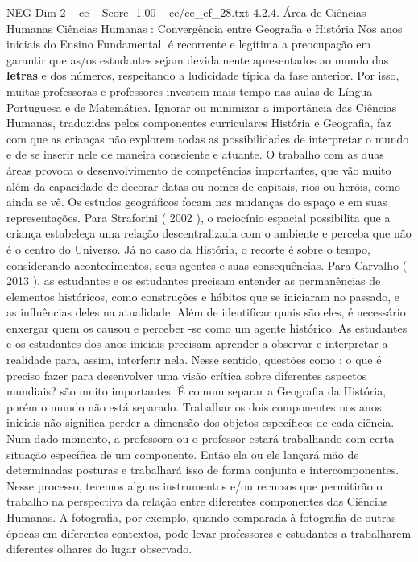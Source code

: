 \begin{textsample}{NEG Dim 2 – ce – Score -1.00 – ce/ce\_ef\_28.txt}  \label{ex:f2_neg_202}
4.2.4.
Área de Ciências Humanas Ciências Humanas : Convergência entre Geografia e História Nos anos iniciais do Ensino Fundamental, é recorrente e legítima a preocupação em garantir que as/os estudantes sejam devidamente apresentados ao mundo das \textbf{letras} e dos números, respeitando a ludicidade típica da fase anterior.
Por isso, muitas professoras e professores investem mais tempo nas aulas de Língua Portuguesa e de Matemática.
Ignorar ou minimizar a importância das Ciências Humanas, traduzidas pelos componentes curriculares História e Geografia, faz com que as crianças não explorem todas as possibilidades de interpretar o mundo e de se inserir nele de maneira consciente e atuante.
O trabalho com as duas áreas provoca o desenvolvimento de competências importantes, que vão muito além da capacidade de decorar datas ou nomes de capitais, rios ou heróis, como ainda se vê.
Os estudos geográficos focam nas mudanças do espaço e em suas representações.
Para Straforini ( 2002 ), o raciocínio espacial possibilita que a criança estabeleça uma relação descentralizada com o ambiente e perceba que não é o centro do Universo.
Já no caso da História, o recorte é sobre o tempo, considerando acontecimentos, seus agentes e suas consequências.
Para Carvalho ( 2013 ), as estudantes e os estudantes precisam entender as permanências de elementos históricos, como construções e hábitos que se iniciaram no passado, e as influências deles na atualidade.
Além de identificar quais são eles, é necessário enxergar quem os causou e perceber -se como um agente histórico.
As estudantes e os estudantes dos anos iniciais precisam aprender a observar e interpretar a realidade para, assim, interferir nela.
Nesse sentido, questões como : o que é preciso fazer para desenvolver uma visão crítica sobre diferentes aspectos mundiais? são muito importantes.
É comum separar a Geografia da História, porém o mundo não está separado.
Trabalhar os dois componentes nos anos iniciais não significa perder a dimensão dos objetos específicos de cada ciência.
Num dado momento, a professora ou o professor estará trabalhando com certa situação específica de um componente.
Então ela ou ele lançará mão de determinadas posturas e trabalhará isso de forma conjunta e intercomponentes.
Nesse processo, teremos alguns instrumentos e/ou recursos que permitirão o trabalho na perspectiva da relação entre diferentes componentes das Ciências Humanas.
A fotografia, por exemplo, quando comparada à fotografia de outras épocas em diferentes contextos, pode levar professores e estudantes a trabalharem diferentes olhares do lugar observado.

\end{textsample}
